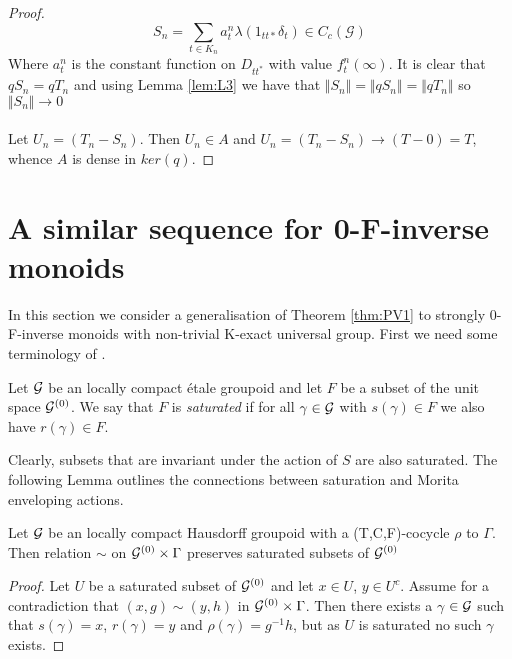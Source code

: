 \begin{corollary}
\begin{proof}
\begin{equation}
S_{n} = \sum_{t \in K_{n}} a^{n}_{t}\lambda(1_{tt*}\delta_{t}) \in C_{c}(\mathcal{G})
\end{equation}
Where $a^{n}_{t}$ is the constant function on $D_{tt^{*}}$ with value $f_{t}^{n}(\infty)$. It is clear that $qS_{n}=qT_{n}$ and using Lemma \ref{lem:L3} we have that $\Vert S_{n} \Vert = \Vert qS_{n} \Vert = \Vert qT_{n} \Vert$ so $\Vert S_{n} \Vert \rightarrow 0$\\
\\
Let $U_{n}=(T_{n}-S_{n})$. Then $U_{n} \in A$ and $U_{n}=(T_{n}-S_{n}) \rightarrow (T-0)=T$, whence $A$ is dense in $ker(q)$.
\end{proof} 
\section{A similar sequence for 0-F-inverse monoids}\label{sect:S2}
In this section we consider a generalisation of Theorem \ref{thm:PV1} to strongly 0-F-inverse monoids with non-trivial K-exact universal group. First we need some terminology of \cite{MR1911663}.

\begin{definition}
Let $\mathcal{G}$ be an locally compact \'etale groupoid and let $F$ be a subset of the unit space $\mathcal{G}^{(0)}$. We say that $F$ is \textit{saturated} if for all $\gamma \in \mathcal{G}$ with $s(\gamma) \in F$ we also have $r(\gamma)\in F$. 
\end{definition}

Clearly, subsets that are invariant under the action of $S$ are also saturated. The following Lemma outlines the connections between saturation and Morita enveloping actions.

\begin{lemma}\label{Lem:Cut}
Let $\mathcal{G}$ be an \etale locally compact Hausdorff groupoid with a (T,C,F)-cocycle $\rho$ to $\Gamma$. Then relation $\sim$ on $\mathcal{G}^{(0)} \times \Gamma$ preserves saturated subsets of $\mathcal{G}^{(0)}$
\end{lemma}
\begin{proof}
Let $U$ be a saturated subset of $\mathcal{G}^{(0)}$ and let $x \in U$, $y \in U^{c}$. Assume for a contradiction that $(x,g) \sim (y,h)$ in $\mathcal{G}^{(0)} \times \Gamma$. Then there exists a $\gamma$ $\in \mathcal{G}$ such that $s(\gamma)=x$, $r(\gamma)=y$ and $\rho(\gamma)=g^{-1}h$, but as $U$ is saturated no such $\gamma$ exists. 
\end{proof}


\end{corollary}
